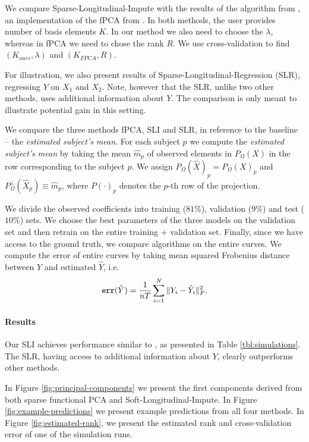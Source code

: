 \documentclass[preprint]{imsart}
\numberwithin{equation}{section}
\theoremstyle{plain}
\begin{document}
We compare Sparse-Longitudinal-Impute with the results of the algorithm from \citet{peng2009geometric}, an implementation of the fPCA from \citep{james2000principal}. In both methods, the user provides number of basis elements $K$. In our method we also need to choose the $\lambda$, whereas in fPCA we need to chose the rank $R$. We use cross-validation to find $(K_{ours},\lambda)$ and $(K_{FPCA},R)$.

For illustration, we also present results of Sparse-Longitudinal-Regression (SLR), regressing $Y$ on $X_1$ and $X_2$. Note, however that the SLR, unlike two other methods, uses additional information about $Y$. The comparison is only meant to illustrate potential gain in this setting.

We compare the three methods fPCA, SLI and SLR, in reference to the baseline -- the {\it estimated subject's mean}. For each subject $p$ we compute the {\it estimated subject's mean} by taking the mean $\hat{m}_p$ of observed elements in $P_\Omega(X)$ in the row corresponding to the subject $p$. We assign $P_\Omega(\hat{X})_p = P_\Omega(X)_p$ and $P^\perp_\Omega (\hat{X}_p) \equiv \hat{m}_p$, where $P(\cdot)_p$ denotes the $p$-th row of the projection.

We divide the observed coefficients into training ($81\%$), validation ($9\%$) and test ($10\%$) sets. We choose the best parameters of the three models on the validation set and then retrain on the entire training + validation set. Finally, since we have access to the ground truth, we compare algorithms on the entire curves. We compute the error of entire curves by taking mean squared Frobenius distance between $Y$ and estimated $\hat{Y}$, i.e.
\[
 \verb|err|(\hat{Y}) = \frac{1}{nT} \sum_{i=1}^N \|Y_i - \hat{Y}_i \|_F^2.
\]
\paragraph{Results}

Our SLI achieves performance similar to \citep{james2000principal}, as presented in Table \ref{tbl:simulations}. The SLR, having access to additional information about $Y$, clearly outperforms other methods.

In Figure \ref{fig:principal-components} we present the first components derived from both sparse functional PCA and Soft-Longitudinal-Impute. In Figure \ref{fig:example-predictions} we present example predictions from all four methods. In Figure \ref{fig:estimated-rank}, we present the estimated rank and cross-validation error of one of the simulation runs.
\end{document}
